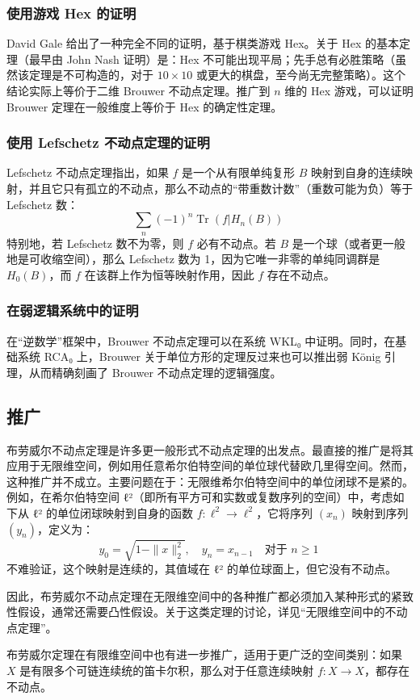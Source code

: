 \subsubsection{使用游戏 Hex 的证明}
David Gale 给出了一种完全不同的证明，基于棋类游戏 Hex。关于 Hex 的基本定理（最早由 John Nash 证明）是：Hex 不可能出现平局；先手总有必胜策略（虽然该定理是不可构造的，对于 $10 \times 10$ 或更大的棋盘，至今尚无完整策略）。这个结论实际上等价于二维 Brouwer 不动点定理。推广到 $n$ 维的 Hex 游戏，可以证明 Brouwer 定理在一般维度上等价于 Hex 的确定性定理。
\subsubsection{使用 Lefschetz 不动点定理的证明}
Lefschetz 不动点定理指出，如果 $f$ 是一个从有限单纯复形 $B$ 映射到自身的连续映射，并且它只有孤立的不动点，那么不动点的“带重数计数”（重数可能为负）等于 Lefschetz 数：
$$
\sum_n (-1)^n \operatorname{Tr}(f|H_n(B))~
$$
特别地，若 Lefschetz 数不为零，则 $f$ 必有不动点。若 $B$ 是一个球（或者更一般地是可收缩空间），那么 Lefschetz 数为 1，因为它唯一非零的单纯同调群是 $H_0(B)$，而 $f$ 在该群上作为恒等映射作用，因此 $f$ 存在不动点。
\subsubsection{在弱逻辑系统中的证明}
在“逆数学”框架中，Brouwer 不动点定理可以在系统 WKL₀ 中证明。同时，在基础系统 RCA₀ 上，Brouwer 关于单位方形的定理反过来也可以推出弱 König 引理，从而精确刻画了 Brouwer 不动点定理的逻辑强度。
\subsection{推广}
布劳威尔不动点定理是许多更一般形式不动点定理的出发点。最直接的推广是将其应用于无限维空间，例如用任意希尔伯特空间的单位球代替欧几里得空间。然而，这种推广并不成立。主要问题在于：无限维希尔伯特空间中的单位闭球不是紧的。例如，在希尔伯特空间 ℓ²（即所有平方可和实数或复数序列的空间）中，考虑如下从 ℓ² 的单位闭球映射到自身的函数 $f : \ell^2 \to \ell^2$，它将序列 $(x_n)$ 映射到序列 $(y_n)$，定义为：
$$
y_0 = \sqrt{1 - \|x\|_2^2}, \quad y_n = x_{n-1} \quad \text{对于 } n \geq 1~
$$
不难验证，这个映射是连续的，其值域在 ℓ² 的单位球面上，但它没有不动点。

因此，布劳威尔不动点定理在无限维空间中的各种推广都必须加入某种形式的紧致性假设，通常还需要凸性假设。关于这类定理的讨论，详见“无限维空间中的不动点定理”。

布劳威尔定理在有限维空间中也有进一步推广，适用于更广泛的空间类别：如果 $X$ 是有限多个可链连续统的笛卡尔积，那么对于任意连续映射 $f: X \rightarrow X$，都存在不动点。

